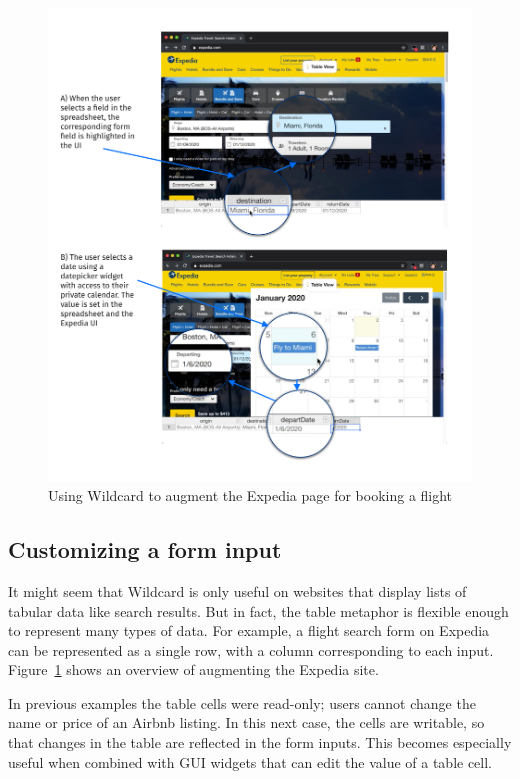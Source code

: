 \documentclass[english,submission]{programming}
\begin{document}
\begin{figure}
\hypertarget{fig:expedia-demo}{%
\centering
\includegraphics{media/expedia-demo-300dpi.png}
\caption{Using Wildcard to augment the Expedia page for booking a
flight}\label{fig:expedia-demo}
}
\end{figure}

\hypertarget{customizing-a-form-input}{%
\subsection{Customizing a form input}\label{customizing-a-form-input}}

It might seem that Wildcard is only useful on websites that display
lists of tabular data like search results. But in fact, the table
metaphor is flexible enough to represent many types of data. For
example, a flight search form on Expedia can be represented as a single
row, with a column corresponding to each input. {
Figure~\ref{fig:expedia-demo} shows an overview of augmenting the
Expedia site.}

In previous examples the table cells were read-only; users cannot change
the name or price of an Airbnb listing. In this next case, the cells are
writable, so that changes in the table are reflected in the form inputs.
This becomes especially useful when combined with GUI widgets that can
edit the value of a table cell.
\end{document}
